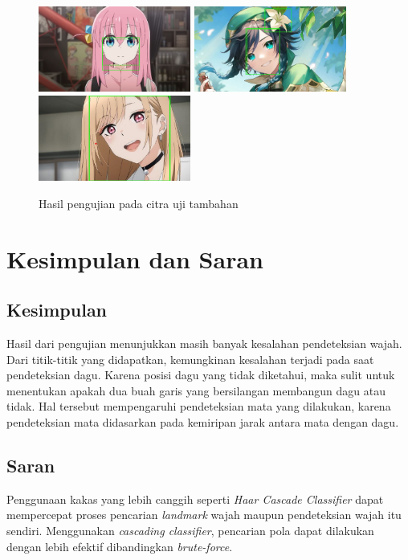 \documentclass[conference, a4paper]{IEEEtran}
\begin{document}
\begin{figure}[h]
  \begin{center}
    \includegraphics[width=5cm]{img/result_bocchi.jpg}
    \includegraphics[width=5cm]{img/result_venti.jpg}
    \includegraphics[width=5cm]{img/result_marin.jpg}
  \end{center}
  \caption{Hasil pengujian pada citra uji tambahan}\label{extrares}
\end{figure}

\section{Kesimpulan dan Saran}
\subsection{Kesimpulan}
Hasil dari pengujian menunjukkan masih banyak kesalahan pendeteksian wajah. Dari titik-titik yang didapatkan, kemungkinan kesalahan terjadi pada saat pendeteksian dagu. Karena posisi dagu yang tidak diketahui, maka sulit untuk menentukan apakah dua buah garis yang bersilangan membangun dagu atau tidak. Hal tersebut mempengaruhi pendeteksian mata yang dilakukan, karena pendeteksian mata didasarkan pada kemiripan jarak antara mata dengan dagu.

\subsection{Saran}
Penggunaan kakas yang lebih canggih seperti \textit{Haar Cascade Classifier} dapat mempercepat proses pencarian \textit{landmark} wajah maupun pendeteksian wajah itu sendiri. Menggunakan \textit{cascading classifier}, pencarian pola dapat dilakukan dengan lebih efektif dibandingkan \textit{brute-force}.
\end{document}
